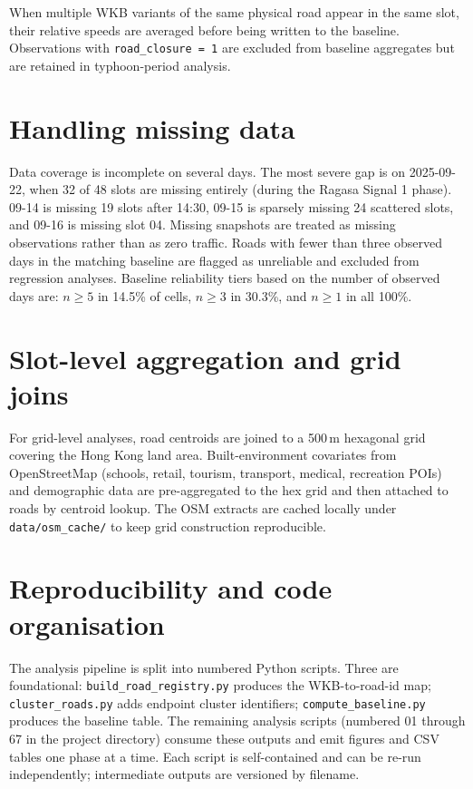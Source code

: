 \documentclass[12pt,a4paper]{report}
\begin{document}
When multiple WKB variants of the same physical road appear in the same slot, their relative speeds are averaged before being written to the baseline. Observations with \texttt{road\_closure = 1} are excluded from baseline aggregates but are retained in typhoon-period analysis.

\section{Handling missing data}
Data coverage is incomplete on several days. The most severe gap is on 2025-09-22, when 32 of 48 slots are missing entirely (during the Ragasa Signal 1 phase). 09-14 is missing 19 slots after 14:30, 09-15 is sparsely missing 24 scattered slots, and 09-16 is missing slot 04. Missing snapshots are treated as missing observations rather than as zero traffic. Roads with fewer than three observed days in the matching baseline are flagged as unreliable and excluded from regression analyses. Baseline reliability tiers based on the number of observed days are: $n \ge 5$ in 14.5\% of cells, $n \ge 3$ in 30.3\%, and $n \ge 1$ in all 100\%.

\section{Slot-level aggregation and grid joins}
For grid-level analyses, road centroids are joined to a 500\,m hexagonal grid covering the Hong Kong land area. Built-environment covariates from OpenStreetMap (schools, retail, tourism, transport, medical, recreation POIs) and demographic data are pre-aggregated to the hex grid and then attached to roads by centroid lookup. The OSM extracts are cached locally under \texttt{data/osm\_cache/} to keep grid construction reproducible.

\section{Reproducibility and code organisation}
The analysis pipeline is split into numbered Python scripts. Three are foundational: \texttt{build\_road\_registry.py} produces the WKB-to-road-id map; \texttt{cluster\_roads.py} adds endpoint cluster identifiers; \texttt{compute\_baseline.py} produces the baseline table. The remaining analysis scripts (numbered 01 through 67 in the project directory) consume these outputs and emit figures and CSV tables one phase at a time. Each script is self-contained and can be re-run independently; intermediate outputs are versioned by filename.
\end{document}
